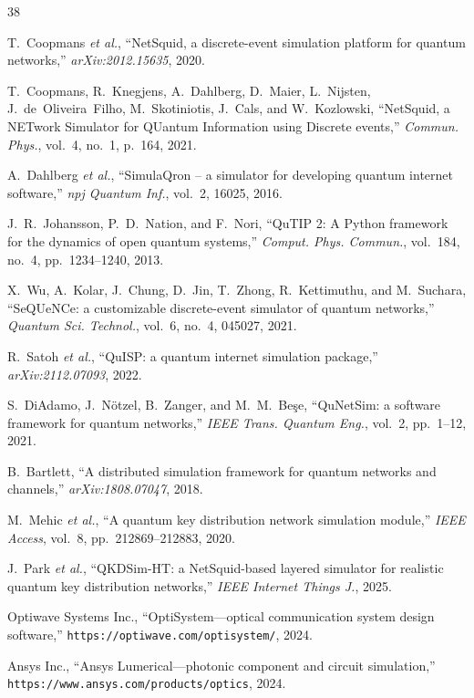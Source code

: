 \documentclass[11pt,a4paper]{article}
\begin{document}
\begin{thebibliography}{38}

T.~Coopmans \textit{et al.}, ``NetSquid, a discrete-event simulation
platform for quantum networks,'' \textit{arXiv:2012.15635}, 2020.

T.~Coopmans, R.~Knegjens, A.~Dahlberg, D.~Maier, L.~Nijsten,
J.~de~Oliveira~Filho, M.~Skotiniotis, J.~Cals, and W.~Kozlowski,
``NetSquid, a NETwork Simulator for QUantum Information using Discrete
events,'' \textit{Commun. Phys.}, vol.~4, no.~1, p.~164, 2021.

A.~Dahlberg \textit{et al.}, ``SimulaQron -- a simulator for developing
quantum internet software,'' \textit{npj Quantum Inf.}, vol.~2, 16025, 2016.

J.~R.~Johansson, P.~D.~Nation, and F.~Nori, ``QuTIP 2: A Python framework
for the dynamics of open quantum systems,'' \textit{Comput. Phys. Commun.},
vol.~184, no.~4, pp.~1234--1240, 2013.

X.~Wu, A.~Kolar, J.~Chung, D.~Jin, T.~Zhong, R.~Kettimuthu, and
M.~Suchara, ``SeQUeNCe: a customizable discrete-event simulator of
quantum networks,'' \textit{Quantum Sci. Technol.}, vol.~6, no.~4,
045027, 2021.

R.~Satoh \textit{et al.}, ``QuISP: a quantum internet simulation
package,'' \textit{arXiv:2112.07093}, 2022.

S.~DiAdamo, J.~N\"otzel, B.~Zanger, and M.~M.~Be\c{s}e,
``QuNetSim: a software framework for quantum networks,''
\textit{IEEE Trans. Quantum Eng.}, vol.~2, pp.~1--12, 2021.

B.~Bartlett, ``A distributed simulation framework for quantum networks
and channels,'' \textit{arXiv:1808.07047}, 2018.

M.~Mehic \textit{et al.}, ``A quantum key distribution network simulation
module,'' \textit{IEEE Access}, vol.~8, pp.~212869--212883, 2020.

J.~Park \textit{et al.}, ``QKDSim-HT: a NetSquid-based layered simulator
for realistic quantum key distribution networks,'' \textit{IEEE Internet
Things J.}, 2025.

Optiwave Systems Inc., ``OptiSystem---optical communication system
design software,'' \texttt{https://optiwave.com/optisystem/}, 2024.

Ansys Inc., ``Ansys Lumerical---photonic component and circuit
simulation,'' \texttt{https://www.ansys.com/products/optics}, 2024.


\end{thebibliography}
\end{document}
